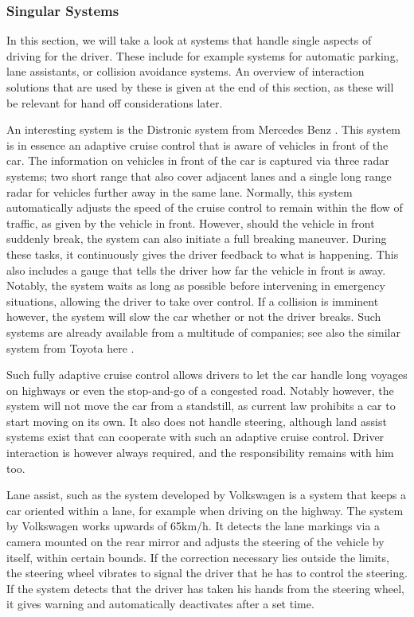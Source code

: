 \documentclass{acm_proc_article-sp}
\begin{document}
\subsubsection{Singular Systems}
\label{singular_systems}

In this section, we will take a look at systems that handle single aspects of driving for the driver.
These include for example systems for automatic parking, lane assistants, or collision avoidance systems.
An overview of interaction solutions that are used by these is given at the end of this section, as these will be relevant for hand off considerations later.

An interesting system is the Distronic system from Mercedes Benz \cite{www:mercedes_pre_safe}.
This system is in essence an adaptive cruise control that is aware of vehicles in front of the car.
The information on vehicles in front of the car is captured via three radar systems; two short range that also cover adjacent lanes and a single long range radar for vehicles further away in the same lane.
Normally, this system automatically adjusts the speed of the cruise control to remain within the flow of traffic, as given by the vehicle in front.
However, should the vehicle in front suddenly break, the system can also initiate a full breaking maneuver.
During these tasks, it continuously gives the driver feedback to what is happening.
This also includes a gauge that tells the driver how far the vehicle in front is away.
Notably, the system waits as long as possible before intervening in emergency situations, allowing the driver to take over control.
If a collision is imminent however, the system will slow the car whether or not the driver breaks.
Such systems are already available from a multitude of companies; see also the similar system from Toyota here \cite{www:toyota_pcs}.

Such fully adaptive cruise control allows drivers to let the car handle long voyages on highways or even the stop-and-go of a congested road.
Notably however, the system will not move the car from a standstill, as current law prohibits a car to start moving on its own.
It also does not handle steering, although land assist systems exist that can cooperate with such an adaptive cruise control.
Driver interaction is however always required, and the responsibility remains with him too.

Lane assist, such as the system developed by Volkswagen \cite{www:vw_lane_assist} is a system that keeps a car oriented within a lane, for example when driving on the highway.
The system by Volkswagen works upwards of 65km/h.
It detects the lane markings via a camera mounted on the rear mirror and adjusts the steering of the vehicle by itself, within certain bounds.
If the correction necessary lies outside the limits, the steering wheel vibrates to signal the driver that he has to control the steering.
If the system detects that the driver has taken his hands from the steering wheel, it gives warning and automatically deactivates after a set time.
\end{document}
